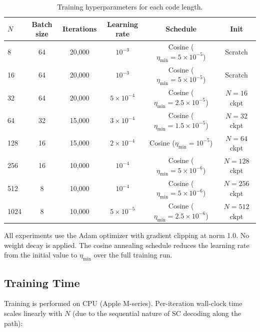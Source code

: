 \documentclass[11pt,a4paper]{article}
\begin{document}
\begin{table}[H]
\centering
\caption{Training hyperparameters for each code length.}
\label{tab:hyperparams}
\begin{tabular}{lccccc}
\toprule
$N$ & Batch size & Iterations & Learning rate & Schedule & Init \\
\midrule
8   & 64  & 20{,}000 & $10^{-3}$ & Cosine ($\eta_{\min} = 5 \times 10^{-5}$) & Scratch \\
16  & 64  & 20{,}000 & $10^{-3}$ & Cosine ($\eta_{\min} = 5 \times 10^{-5}$) & Scratch \\
32  & 64  & 20{,}000 & $5 \times 10^{-4}$ & Cosine ($\eta_{\min} = 2.5 \times 10^{-5}$) & $N{=}16$ ckpt \\
64  & 32  & 15{,}000 & $3 \times 10^{-4}$ & Cosine ($\eta_{\min} = 1.5 \times 10^{-5}$) & $N{=}32$ ckpt \\
128 & 16  & 15{,}000 & $2 \times 10^{-4}$ & Cosine ($\eta_{\min} = 10^{-5}$) & $N{=}64$ ckpt \\
256 & 16  & 10{,}000 & $10^{-4}$ & Cosine ($\eta_{\min} = 5 \times 10^{-6}$) & $N{=}128$ ckpt \\
512 & 8   & 10{,}000 & $10^{-4}$ & Cosine ($\eta_{\min} = 5 \times 10^{-6}$) & $N{=}256$ ckpt \\
1024 & 8  & 10{,}000 & $5 \times 10^{-5}$ & Cosine ($\eta_{\min} = 2.5 \times 10^{-6}$) & $N{=}512$ ckpt \\
\bottomrule
\end{tabular}
\end{table}

All experiments use the Adam optimizer with gradient clipping at norm 1.0. No weight decay is applied. The cosine annealing schedule reduces the learning rate from the initial value to $\eta_{\min}$ over the full training run.

\subsection{Training Time}

Training is performed on CPU (Apple M-series). Per-iteration wall-clock time scales linearly with $N$ (due to the sequential nature of SC decoding along the path):
\end{document}
